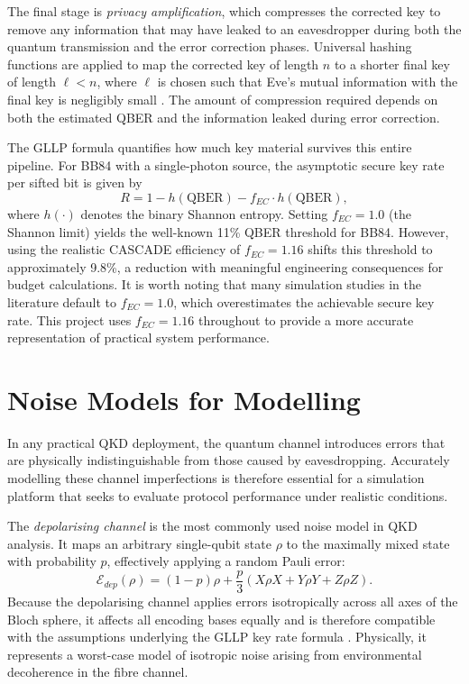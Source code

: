 \documentclass[10pt, a4paper]{report}
\begin{document}
The final stage is \textit{privacy amplification}, which compresses the corrected key to remove any information that may have leaked to an eavesdropper during both the quantum transmission and the error correction phases. Universal hashing functions are applied to map the corrected key of length $n$ to a shorter final key of length $\ell < n$, where $\ell$ is chosen such that Eve's mutual information with the final key is negligibly small \cite{Bennett1995PA}. The amount of compression required depends on both the estimated QBER and the information leaked during error correction.

The GLLP formula \cite{GLLP2004} quantifies how much key material survives this entire pipeline. For BB84 with a single-photon source, the asymptotic secure key rate per sifted bit is given by
%
\begin{equation}
\label{eq:gllp}
R = 1 - h(\text{QBER}) - f_{EC} \cdot h(\text{QBER}),
\end{equation}
%
where $h(\cdot)$ denotes the binary Shannon entropy. Setting $f_{EC} = 1.0$ (the Shannon limit) yields the well-known 11\% QBER threshold for BB84. However, using the realistic CASCADE efficiency of $f_{EC} = 1.16$ shifts this threshold to approximately 9.8\%, a reduction with meaningful engineering consequences for budget calculations. It is worth noting that many simulation studies in the literature default to $f_{EC} = 1.0$, which overestimates the achievable secure key rate. This project uses $f_{EC} = 1.16$ throughout to provide a more accurate representation of practical system performance.

\section{Noise Models for Modelling} 

In any practical QKD deployment, the quantum channel introduces errors that are physically indistinguishable from those caused by eavesdropping. Accurately modelling these channel imperfections is therefore essential for a simulation platform that seeks to evaluate protocol performance under realistic conditions.

The \textit{depolarising channel} is the most commonly used noise model in QKD analysis. It maps an arbitrary single-qubit state $\rho$ to the maximally mixed state with probability $p$, effectively applying a random Pauli error:
%
\begin{equation}
\label{eq:depolarising}
\mathcal{E}_{dep}(\rho) = (1-p)\rho + \frac{p}{3}(X\rho X + Y\rho Y + Z\rho Z).
\end{equation}
%
Because the depolarising channel applies errors isotropically across all axes of the Bloch sphere, it affects all encoding bases equally and is therefore compatible with the assumptions underlying the GLLP key rate formula \cite{GLLP2004}. Physically, it represents a worst-case model of isotropic noise arising from environmental decoherence in the fibre channel.
\end{document}
